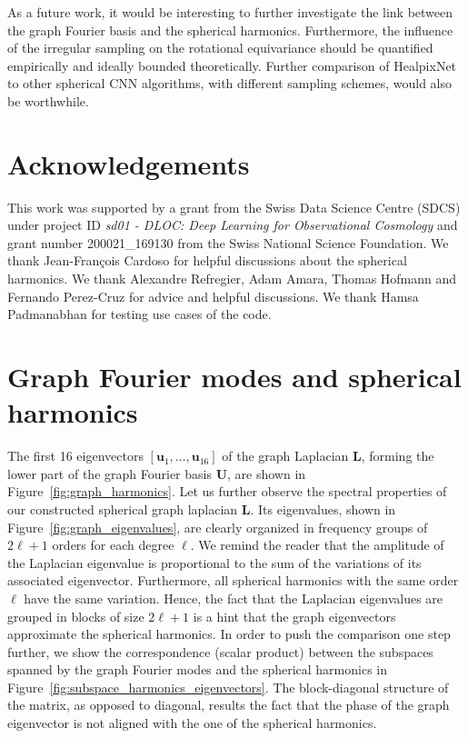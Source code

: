 \documentclass[final,twocolumn,3p,times,sort&compress]{elsarticle}
\newcommand{\TK}[1]{{\color{red}{TK:#1}}}
\newcommand{\figref}[1]{Figure~\ref{fig:#1}}
\renewcommand{\b}[1]{{\bm{#1}}}   %
\newcommand{\1}{\b{1}}              %
\newcommand{\0}{\b{0}}              %
\renewcommand{\L}{\b{L}}
\newcommand{\U}{\b{U}}
\begin{document}
As a future work, it would be interesting to further investigate the link between the graph Fourier basis and the spherical harmonics. Furthermore, the influence of the irregular sampling on the rotational equivariance should be quantified empirically and ideally bounded theoretically.
Further comparison of HealpixNet to other spherical CNN algorithms, with different sampling schemes, would also be worthwhile.


\section*{Acknowledgements}

This work was supported by a grant from the Swiss Data Science Centre (SDCS) under project ID \textit{sd01 - DLOC:  Deep Learning for Observational Cosmology} and grant number 200021\_169130 from the Swiss National Science Foundation.
We thank Jean-François Cardoso for helpful discussions about the spherical harmonics.
We thank Alexandre Refregier, Adam Amara, Thomas Hofmann and Fernando Perez-Cruz for advice and helpful discussions.
We thank Hamsa Padmanabhan for testing use cases of the code.

\appendix

\section{Graph Fourier modes and spherical harmonics}
\label{sec:comparison_spherical_harmonics}
The first 16 eigenvectors $[\b u_1, \ldots, \b u_{16}]$ of the graph Laplacian $\L$, forming the lower part of the graph Fourier basis $\U$, are shown in \figref{graph_harmonics}.
Let us further observe the spectral properties of our constructed spherical graph laplacian $\L$.
Its eigenvalues, shown in \figref{graph_eigenvalues}, are clearly organized in frequency groups of $2\ell + 1$ orders for each degree $\ell$.
We remind the reader that the amplitude of the Laplacian eigenvalue is proportional to the sum of the variations of its associated eigenvector. Furthermore, all spherical harmonics with the same order $\ell$ have the same variation. Hence, the fact that the Laplacian eigenvalues are grouped in blocks of size $2\ell + 1$ is a hint that the graph eigenvectors approximate the spherical harmonics.
In order to push the comparison one step further, we show the correspondence (scalar product) between the subspaces spanned by the graph Fourier modes and the spherical harmonics in \figref{subspace_harmonics_eigenvectors}.
The block-diagonal structure of the matrix, as opposed to diagonal, results the fact that the phase of the graph eigenvector is not aligned with the one of the spherical harmonics.
\end{document}
